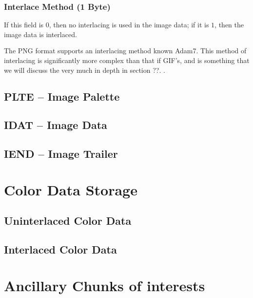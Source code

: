 \subsubsection*{Interlace Method (1 Byte)}

If this field is $0$, then no interlacing is used in the image data; if it
is $1$, then the image data is interlaced.

The PNG format supports an interlacing method known Adam7. This method
of interlacing is significantly more complex than that if GIF's, and
is something that we will discuss the very much in depth in section
??. .

\subsection{PLTE -- Image Palette}

\subsection{IDAT -- Image Data}

\subsection{IEND -- Image Trailer}

\section{Color Data Storage}

\subsection{Uninterlaced Color Data}

\subsection{Interlaced Color Data}

\section{Ancillary Chunks of interests }



